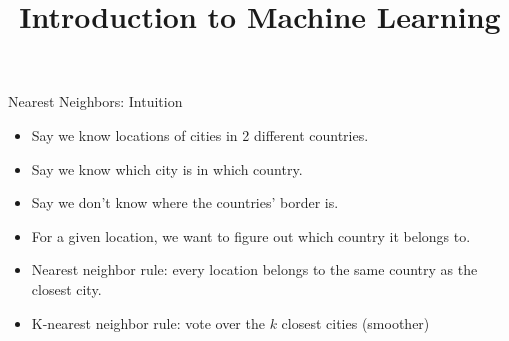 \documentclass[11pt,compress,t,notes=noshow, xcolor=table]{beamer}
\title{Introduction to Machine Learning}
\institute{\href{https://compstat-lmu.github.io/lecture_i2ml/}{compstat-lmu.github.io/lecture\_i2ml}}
\date{}
\begin{document}















\begin{vbframe}{Nearest Neighbors: Intuition}

\begin{itemize}
 \item Say we know locations of cities in 2 different countries.
 \item Say we know which city is in which country.
 \item Say we don't know where the countries' border is.
 \item For a given location, we want to figure out which country it belongs to.
 \item Nearest neighbor rule: every location belongs to the same country as the closest city.
 \item K-nearest neighbor rule: vote over the $k$ closest cities (smoother)
\end{itemize}
\end{vbframe}
\end{document}
